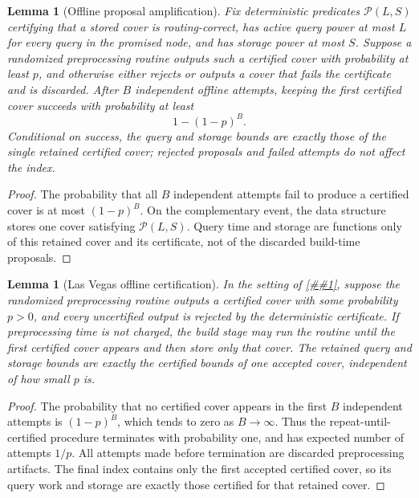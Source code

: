 \documentclass[10pt]{article}
\newcommand{\cref}[1]{\ref{##1}}
\newtheorem{lemma}[theorem]{Lemma}
\theoremstyle{definition}
\begin{document}
\begin{lemma}[Offline proposal amplification]\label{lem:offline-amplification}
   Fix deterministic predicates $\mathcal P(L,S)$ certifying that a stored
   cover is routing-correct, has active query power at most $L$ for every
   query in the promised node, and has storage power at most $S$.  Suppose a
   randomized preprocessing routine outputs such a certified cover with
   probability at least $p$, and otherwise either rejects or outputs a cover
   that fails the certificate and is discarded.  After $B$ independent offline
   attempts, keeping the first certified cover succeeds with probability at
   least
   \[
      1-(1-p)^B .
   \]
   Conditional on success, the query and storage bounds are exactly those of
   the single retained certified cover; rejected proposals and failed attempts
   do not affect the index.
\end{lemma}

\begin{proof}
   The probability that all $B$ independent attempts fail to produce a certified
   cover is at most $(1-p)^B$.  On the complementary event, the data structure
   stores one cover satisfying $\mathcal P(L,S)$.  Query time and storage are
   functions only of this retained cover and its certificate, not of the
   discarded build-time proposals.
\end{proof}

\begin{lemma}[Las Vegas offline certification]\label{lem:las-vegas-offline}
   In the setting of \cref{lem:offline-amplification}, suppose the randomized
   preprocessing routine outputs a certified cover with some probability
   $p>0$, and every uncertified output is rejected by the deterministic
   certificate.  If preprocessing time is not charged, the build stage may run
   the routine until the first certified cover appears and then store only that
   cover.  The retained query and storage bounds are exactly the certified
   bounds of one accepted cover, independent of how small $p$ is.
\end{lemma}

\begin{proof}
   The probability that no certified cover appears in the first $B$ independent
   attempts is $(1-p)^B$, which tends to zero as $B\to\infty$.  Thus the
   repeat-until-certified procedure terminates with probability one, and has
   expected number of attempts $1/p$.  All attempts made before termination are
   discarded preprocessing artifacts.  The final index contains only the first
   accepted certified cover, so its query work and storage are exactly those
   certified for that retained cover.
\end{proof}
\end{document}
